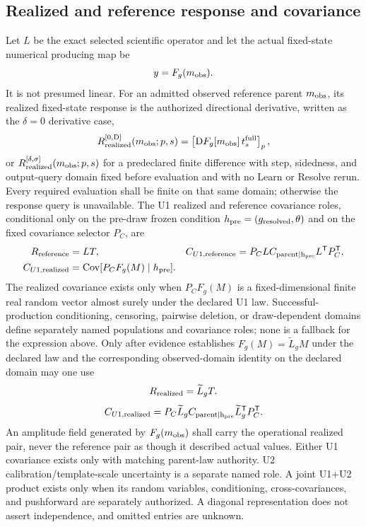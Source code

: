 \subsection{Realized and reference response and covariance}
\label{sec:realized-reference}

Let $L$ be the exact selected scientific operator and let the actual
fixed-state numerical producing map be
\[
 y=F_g(m_{\rm obs}).
\]
It is not presumed linear. For an admitted observed reference parent
$m_{\rm obs}$, its realized
fixed-state response is the authorized directional derivative, written as the
$\delta=0$ derivative case,
\begin{equation}
 R_{\rm realized}^{[0,{\rm D}]}(m_{\rm obs};p,s)
 =\left[\mathrm D F_g[m_{\rm obs}]\,t_s^{\rm full}\right]_p,
 \label{eq:realized-response}
\end{equation}
or $R_{\rm realized}^{[\delta,\sigma]}(m_{\rm obs};p,s)$ for a predeclared finite
difference with step, sidedness, and output-query domain fixed before
evaluation and with no Learn or Resolve rerun. Every required evaluation shall
be finite on that same domain; otherwise the response query is unavailable.
The U1 realized and reference covariance roles, conditional only on the
pre-draw frozen condition $h_{\rm pre}=(g_{\rm resolved},\theta)$ and on the
fixed covariance selector $P_C$,
are
\begin{align}
 R_{\rm reference} &= LT,
 & C_{U1,{\rm reference}}
   &=P_CLC_{\rm parent\mid h_{\rm pre}}L^{\mathsf T}P_C^{\mathsf T}, \\
 C_{U1,{\rm realized}}
   &=\operatorname{Cov}[P_CF_g(M)\mid h_{\rm pre}].
\end{align}
The realized covariance exists only when $P_CF_g(M)$ is a fixed-dimensional
finite real random vector almost surely under the declared U1 law. Successful-
production conditioning, censoring, pairwise deletion, or draw-dependent
domains define separately named populations and covariance roles; none is a
fallback for the expression above.
Only after evidence establishes $F_g(M)=\widetilde L_gM$ under the declared
law and the corresponding observed-domain identity on the declared domain
may one use
\[
 R_{\rm realized}=\widetilde L_gT.
\]
\begin{equation}
 C_{U1,{\rm realized}}
 =P_C\widetilde L_gC_{\rm parent\mid h_{\rm pre}}\widetilde L_g^{\mathsf T}P_C^{\mathsf T}.
 \label{eq:realized-linear-covariance}
\end{equation}
An amplitude field generated by $F_g(m_{\rm obs})$ shall carry the operational realized
pair, never the reference pair as though it described actual values. Either
U1 covariance exists only with matching parent-law authority. U2
calibration/template-scale uncertainty is a separate named role. A joint
U1+U2 product exists only when its random variables, conditioning,
cross-covariances, and pushforward are separately authorized. A diagonal
representation does not assert independence, and omitted entries are unknown.

